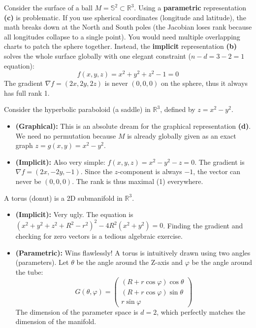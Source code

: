 \begin{example}
Consider the surface of a ball $M = \mathbb{S}^2 \subset \mathbb{R}^3$. 
Using a \textbf{parametric} representation \textbf{(c)} is problematic. If you use spherical coordinates (longitude and latitude), the math breaks down at the North and South poles (the Jacobian loses rank because all longitudes collapse to a single point). You would need multiple overlapping charts to patch the sphere together.
Instead, the \textbf{implicit} representation \textbf{(b)} solves the whole surface globally with one elegant constraint ($n-d = 3-2 = 1$ equation):
\[
f(x,y,z) = x^2 + y^2 + z^2 - 1 = 0
\]
The gradient $\nabla f = (2x, 2y, 2z)$ is never $(0,0,0)$ on the sphere, thus it always has full rank 1.
\end{example}

\begin{example}
Consider the hyperbolic paraboloid (a saddle) in $\mathbb{R}^3$, defined by $z = x^2 - y^2$.
\begin{itemize}
    \item \textbf{(Graphical):} This is an absolute dream for the graphical representation \textbf{(d)}. We need no permutation because $M$ is already globally given as an exact graph $z = g(x,y) = x^2 - y^2$.
    \item \textbf{(Implicit):} Also very simple: $f(x,y,z) = x^2 - y^2 - z = 0$. The gradient is $\nabla f = (2x, -2y, -1)$. Since the $z$-component is always $-1$, the vector can never be $(0,0,0)$. The rank is thus maximal (1) everywhere.
\end{itemize}
\end{example}

\begin{example}
A torus (donut) is a 2D submanifold in $\mathbb{R}^3$.
\begin{itemize}
    \item \textbf{(Implicit):} Very ugly. The equation is $(x^2+y^2+z^2+R^2-r^2)^2 - 4R^2(x^2+y^2) = 0$. Finding the gradient and checking for zero vectors is a tedious algebraic exercise.
    \item \textbf{(Parametric):} Wins flawlessly! A torus is intuitively drawn using two angles (parameters). Let $\theta$ be the angle around the Z-axis and $\varphi$ be the angle around the tube:
    \[
    G(\theta, \varphi) = \begin{pmatrix} (R + r \cos \varphi) \cos \theta \\ (R + r \cos \varphi) \sin \theta \\ r \sin \varphi \end{pmatrix}
    \]
    The dimension of the parameter space is $d=2$, which perfectly matches the dimension of the manifold.
\end{itemize}
\end{example}

